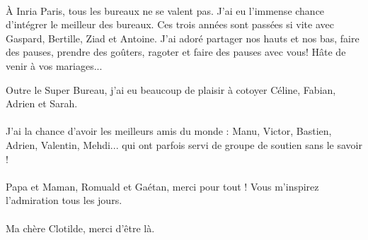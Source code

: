 \paragraph{}
À Inria Paris, tous les bureaux ne se valent pas. J'ai eu l'immense chance d'intégrer le meilleur des bureaux. Ces trois années sont passées si vite avec Gaspard, Bertille, Ziad et Antoine. J'ai adoré partager nos hauts et nos bas, faire des pauses, prendre des goûters, ragoter et faire des pauses avec vous! Hâte de venir à vos mariages...

Outre le Super Bureau, j'ai eu beaucoup de plaisir à cotoyer Céline, Fabian, Adrien et Sarah.

\paragraph{}
J'ai la chance d'avoir les meilleurs amis du monde : Manu, Victor, Bastien, Adrien, Valentin, Mehdi... qui ont parfois servi de groupe de soutien sans le savoir !

\paragraph{}
Papa et Maman, Romuald et Gaétan, merci pour tout ! Vous m'inspirez l'admiration tous les jours.

\paragraph{}
Ma chère Clotilde, merci d'être là.
